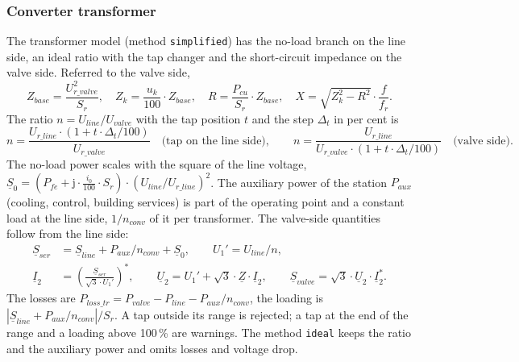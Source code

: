 \subsubsection{Converter transformer}

The transformer model (method \texttt{simplified}) has the no-load branch on the line side, an ideal ratio with the
tap changer and the short-circuit impedance on the valve side. Referred to the valve side,
\begin{equation}
  Z_{base} = \frac{U_{r\_valve}^2}{S_r} , \quad
  Z_k = \frac{u_k}{100} \cdot Z_{base} , \quad
  R = \frac{P_{cu}}{S_r} \cdot Z_{base} , \quad
  X = \sqrt{Z_k^2 - R^2} \cdot \frac{f}{f_r} .
\end{equation}
The ratio $n = U_{line} / U_{valve}$ with the tap position $t$ and the step $\Delta_t$ in per cent is
\begin{equation}
  n = \frac{U_{r\_line} \cdot (1 + t \cdot \Delta_t / 100)}{U_{r\_valve}} \quad \text{(tap on the line side)} ,
  \qquad
  n = \frac{U_{r\_line}}{U_{r\_valve} \cdot (1 + t \cdot \Delta_t / 100)} \quad \text{(valve side)} .
\end{equation}
The no-load power scales with the square of the line voltage,
$\underline{S}_0 = \left( P_{fe} + \mathrm{j} \cdot \tfrac{i_0}{100} \cdot S_r \right) \cdot (U_{line} / U_{r\_line})^2$.
The auxiliary power of the station $P_{aux}$ (cooling, control, building services) is part of the operating point
and a constant load at the line side, $1/n_{conv}$ of it per transformer. The valve-side quantities follow from the
line side:
\begin{align}
  \underline{S}_{ser} &= \underline{S}_{line} + P_{aux} / n_{conv} + \underline{S}_0 , \qquad
  U_1' = U_{line} / n , \\
  \underline{I}_2 &= \left( \frac{\underline{S}_{ser}}{\sqrt{3} \cdot U_1'} \right)^{*} , \qquad
  \underline{U}_2 = U_1' + \sqrt{3} \cdot \underline{Z} \cdot \underline{I}_2 , \qquad
  \underline{S}_{valve} = \sqrt{3} \cdot \underline{U}_2 \cdot \underline{I}_2^{*} .
\end{align}
The losses are $P_{loss\_tr} = P_{valve} - P_{line} - P_{aux} / n_{conv}$, the loading is
$\left| \underline{S}_{line} + P_{aux}/n_{conv} \right| / S_r$. A tap outside its range is rejected; a tap at the end
of the range and a loading above 100\,\% are warnings. The method \texttt{ideal} keeps the ratio and the auxiliary
power and omits losses and voltage drop.
